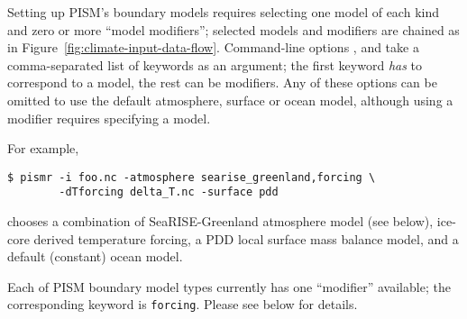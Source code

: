 Setting up PISM's boundary models requires selecting one model of each kind and zero or more ``model modifiers''; selected models and modifiers are chained as in Figure~\ref{fig:climate-input-data-flow}. Command-line options ,  and  take a comma-separated list of keywords as an argument; the first keyword \emph{has} to correspond to a model, the rest can be modifiers. Any of these options can be omitted to use the default atmosphere, surface or ocean model, although using a modifier requires specifying a model.

For example,
\begin{verbatim}
$ pismr -i foo.nc -atmosphere searise_greenland,forcing \
        -dTforcing delta_T.nc -surface pdd
\end{verbatim}%
chooses a combination of SeaRISE-Greenland atmosphere model (see below),  ice-core derived temperature forcing, a PDD local surface mass balance model, and a default (constant) ocean model.

Each of PISM boundary model types currently has one ``modifier'' available; the corresponding keyword is \texttt{forcing}. Please see below for details.

